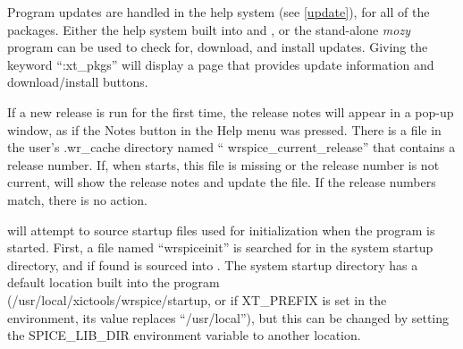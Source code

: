 Program updates are handled in the help system (see \ref{update}), for
all of the {\XicTools} packages.  Either the help system built into
{\Xic} and {\WRspice}, or the stand-alone {\it mozy} program can be
used to check for, download, and install updates.  Giving the keyword
``{\vt :xt\_pkgs}'' will display a page that provides update
information and download/install buttons.

If a new {\WRspice} release is run for the first time, the
release notes will appear in a pop-up window, as if the {\cb Notes}
button in the {\cb Help} menu was pressed.  There is a file in the
user's {\vt .wr\_cache} directory named ``{\vt
wrspice\_current\_release}'' that contains a release number.  If, when
{\WRspice} starts, this file is missing or the release number is not
current, {\WRspice} will show the release notes and update the file. 
If the release numbers match, there is no action.

{\WRspice} will attempt to source startup files used for
initialization when the program is started.  First, a file named
``{\vt wrspiceinit}'' is searched for in the system startup directory,
and if found is sourced into {\WRspice}.  The system startup directory
has a default location built into the program\\
({\vt /usr/local/xictools/wrspice/startup}, or if {\et XT\_PREFIX}
is set in the environment, its value replaces ``{\vt /usr/local}''),
but this can be changed by setting the {\et SPICE\_LIB\_DIR}
environment variable to another location.

